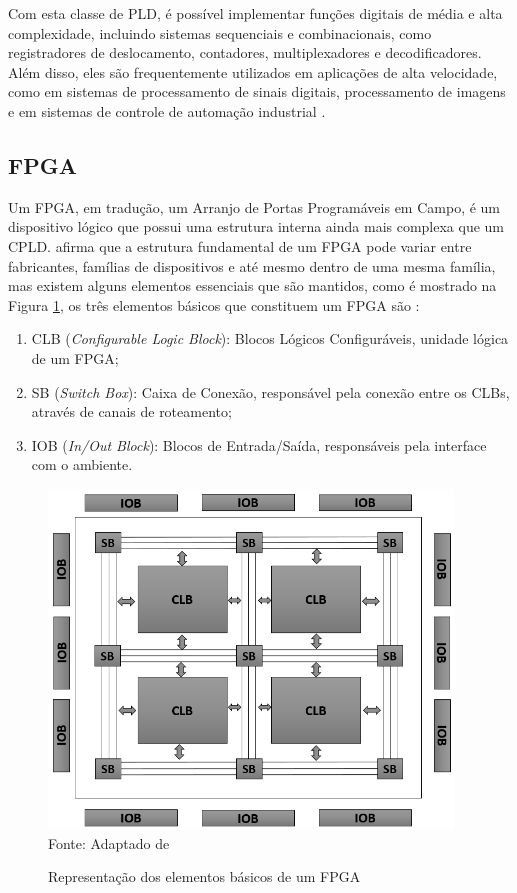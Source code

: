 Com esta classe de PLD, é possível implementar funções digitais de média e alta complexidade, incluindo sistemas sequenciais e combinacionais, como registradores de deslocamento, contadores, multiplexadores e decodificadores. Além disso, eles são frequentemente utilizados em aplicações de alta velocidade, como em sistemas de processamento de sinais digitais, processamento de imagens e em sistemas de controle de automação industrial \cite{pedroni2010eletronica} .

\subsection{FPGA}
Um FPGA, em tradução, um Arranjo de Portas Programáveis em Campo, é um dispositivo lógico que possui uma estrutura interna ainda mais complexa que um CPLD.  afirma que a estrutura fundamental de um FPGA pode variar entre fabricantes, famílias de dispositivos e até mesmo dentro de uma mesma família, mas existem alguns elementos essenciais que são mantidos, como é mostrado na Figura \ref{fig:fpga_01}, os três elementos básicos que constituem um FPGA são :

\begin{enumerate}[label={\noNalph{enumi})}]
    \item CLB (\textit{Configurable Logic Block}): Blocos Lógicos Configuráveis, unidade lógica de um FPGA; 
    \item SB (\textit{Switch Box}): Caixa de Conexão, responsável pela conexão entre os CLBs,  através de canais de roteamento;
    \item IOB (\textit{In/Out Block}): Blocos de Entrada/Saída, responsáveis pela interface com o ambiente.
\end{enumerate}


\begin{figure}[!htb]
    \centering
    \caption{Representação dos elementos básicos de um FPGA}
    \includegraphics[height = 9cm]{figuras/fpga_2.png}\\
    {\footnotesize Fonte: Adaptado de \cite{floyd2009sistemas}}
    \label{fig:fpga_01}
\end{figure}

